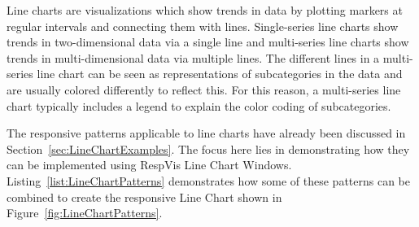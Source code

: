 Line charts are visualizations which show trends in data by plotting
markers at regular intervals and connecting them with lines.
Single-series line charts show trends in two-dimensional data via a
single line and multi-series line charts show trends in
multi-dimensional data via multiple lines. The different lines in a
multi-series line chart can be seen as representations of
subcategories in the data and are usually colored differently to
reflect this. For this reason, a multi-series line chart typically
includes a legend to explain the color coding of subcategories.


The responsive patterns applicable to line charts have already been
discussed in Section~\ref{sec:LineChartExamples}. The focus here lies
in demonstrating how they can be implemented using RespVis Line Chart
Windows. Listing~\ref{list:LineChartPatterns} demonstrates how some of
these patterns can be combined to create the responsive Line Chart
shown in Figure~\ref{fig:LineChartPatterns}.



